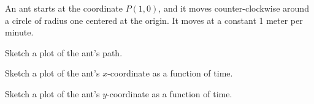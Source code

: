 
\begin{problem}
\item An ant starts at the coordinate $P(1,0)$, and it moves
  counter-clockwise around a circle of radius one centered at the
  origin. It moves at a constant 1 meter per minute.
  \begin{subproblem}
  \item Sketch a plot of the ant's path.
    \vfill
  \item Sketch a plot of the ant's $x$-coordinate as a function of
    time.
    \vfill
  \item Sketch a plot of the ant's $y$-coordinate as a function of
    time.
    \vfill
  \end{subproblem}
\end{problem}


